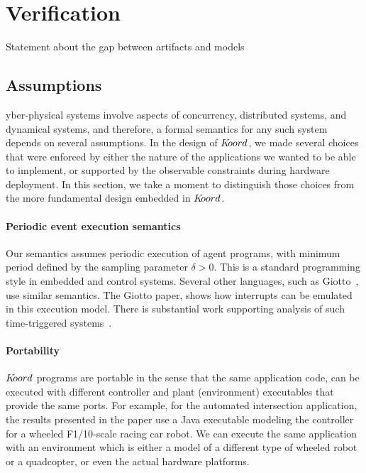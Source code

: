 \section{Verification}
\label{sec:verif}

Statement about the gap between artifacts and models 

\subsection{Assumptions}
yber-physical systems involve aspects of concurrency, distributed systems, and dynamical systems, and therefore, a formal semantics for any such system depends on several assumptions. In the design of $K\kern-2pt oord$, we made several choices that were enforced by either the nature of the applications we wanted to be able to implement, or supported by the observable constraints during hardware deployment.  In this section, we take a moment to distinguish those choices from the more fundamental design embedded in $K\kern-2pt oord$.

\paragraph*{Periodic event execution semantics}
Our semantics assumes periodic execution of agent programs, with minimum period defined by the sampling parameter $\delta>0$. This is a standard programming style in embedded and control systems. Several other languages, such as Giotto~\cite{henzinger2003giotto,benveniste2003synchronous}, use  similar semantics. The Giotto paper, shows how  interrupts can be emulated in this execution model. There is substantial work supporting analysis of such time-triggered systems~\cite{WMLM:TECS2010}.

\paragraph*{Portability}
$K\kern-2pt oord$ programs are portable in the sense that the same application code, can be executed with different controller and plant (environment) executables that provide the same ports. For example, for the automated intersection application, the results presented in the paper use a Java executable modeling the controller for a wheeled F1/10-scale racing car robot. We can execute the same application with an environment which is either a model of a different type of wheeled robot or a quadcopter, or even the actual hardware platforms. 

